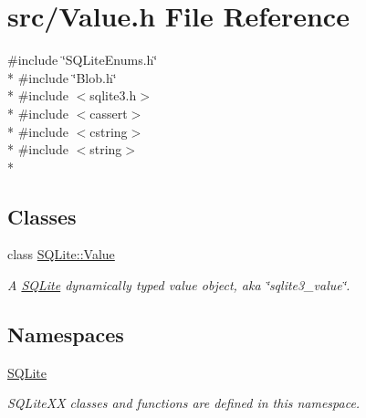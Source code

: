 \hypertarget{a00037}{\section{src/\-Value.h File Reference}
\label{a00037}
}
{\ttfamily \#include \char`\"{}S\-Q\-Lite\-Enums.\-h\char`\"{}}\\*
{\ttfamily \#include \char`\"{}Blob.\-h\char`\"{}}\\*
{\ttfamily \#include $<$sqlite3.\-h$>$}\\*
{\ttfamily \#include $<$cassert$>$}\\*
{\ttfamily \#include $<$cstring$>$}\\*
{\ttfamily \#include $<$string$>$}\\*
\subsection*{Classes}
\begin{DoxyCompactItemize}
\item 
class \hyperlink{a00015}{S\-Q\-Lite\-::\-Value}
\begin{DoxyCompactList}\small\item\em A \hyperlink{a00038}{S\-Q\-Lite} dynamically typed value object, aka \char`\"{}sqlite3\-\_\-value\char`\"{}. \end{DoxyCompactList}\end{DoxyCompactItemize}
\subsection*{Namespaces}
\begin{DoxyCompactItemize}
\item 
\hyperlink{a00038}{S\-Q\-Lite}
\begin{DoxyCompactList}\small\item\em S\-Q\-Lite\-X\-X classes and functions are defined in this namespace. \end{DoxyCompactList}\end{DoxyCompactItemize}

